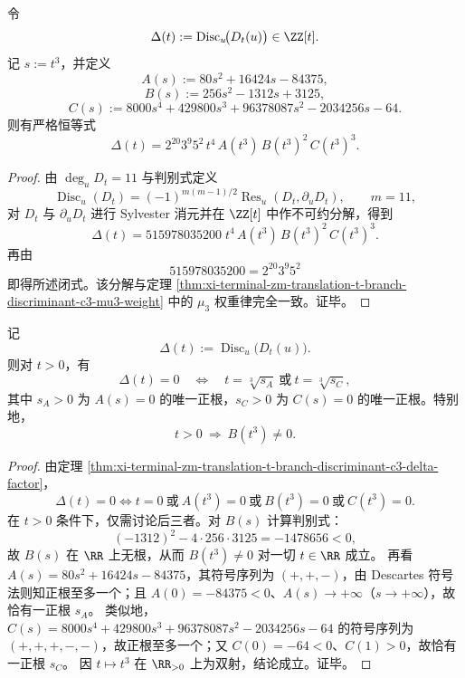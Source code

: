 \begin{theorem}[二次判别式 \texorpdfstring{$\Delta(t)=\operatorname{Disc}_u(D_t)$}{Delta(t)=Disc_u(Dt)} 的完全闭式分解]\label{thm:xi-terminal-zm-translation-t-branch-discriminant-c3-delta-factor}
令
\[
\Delta(t):=\operatorname{Disc}_u\!\bigl(D_t(u)\bigr)\in\ZZ[t].
\]
记 \(s:=t^3\)，并定义
\[
A(s):=80s^2+16424s-84375,
\]
\[
B(s):=256s^2-1312s+3125,
\]
\[
C(s):=8000s^4+429800s^3+96378087s^2-2034256s-64.
\]
则有严格恒等式
\[
\boxed{
\Delta(t)
=2^{20}3^{9}5^{2}\,t^4\,A(t^3)\,B(t^3)^2\,C(t^3)^3.}
\]
\end{theorem}
\begin{proof}
由 \(\deg_u D_t=11\) 与判别式定义
\[
\operatorname{Disc}_u(D_t)=(-1)^{m(m-1)/2}\operatorname{Res}_u(D_t,\partial_u D_t),\qquad m=11,
\]
对 \(D_t\) 与 \(\partial_u D_t\) 进行 Sylvester 消元并在 \(\ZZ[t]\) 中作不可约分解，得到
\[
\Delta(t)=515978035200\;t^4\,A(t^3)\,B(t^3)^2\,C(t^3)^3.
\]
再由
\[
515978035200=2^{20}3^{9}5^{2}
\]
即得所述闭式。该分解与定理
\ref{thm:xi-terminal-zm-translation-t-branch-discriminant-c3-mu3-weight}
中的 \(\mu_3\) 权重律完全一致。证毕。
\end{proof}

\begin{corollary}[正实参数半轴上的分歧碰撞仅发生于两处]\label{cor:xi-terminal-zm-translation-t-branch-discriminant-c3-real-collision}
记
\[
\Delta(t):=\operatorname{Disc}_u\!\bigl(D_t(u)\bigr).
\]
则对 \(t>0\)，有
\[
\Delta(t)=0
\quad\Longleftrightarrow\quad
t=\sqrt[3]{s_A}\ \text{或}\ t=\sqrt[3]{s_C},
\]
其中 \(s_A>0\) 为 \(A(s)=0\) 的唯一正根，\(s_C>0\) 为 \(C(s)=0\) 的唯一正根。特别地，
\[
t>0\ \Longrightarrow\ B(t^3)\neq 0.
\]
\end{corollary}
\begin{proof}
由定理 \ref{thm:xi-terminal-zm-translation-t-branch-discriminant-c3-delta-factor}，
\[
\Delta(t)=0
\iff
t=0\ \text{或}\ A(t^3)=0\ \text{或}\ B(t^3)=0\ \text{或}\ C(t^3)=0.
\]
在 \(t>0\) 条件下，仅需讨论后三者。对 \(B(s)\) 计算判别式：
\[
(-1312)^2-4\cdot 256\cdot 3125=-1478656<0,
\]
故 \(B(s)\) 在 \(\RR\) 上无根，从而 \(B(t^3)\neq 0\) 对一切 \(t\in\RR\) 成立。
再看 \(A(s)=80s^2+16424s-84375\)，其符号序列为 \((+,+,-)\)，由 Descartes 符号法则知正根至多一个；且 \(A(0)=-84375<0\)、\(A(s)\to+\infty\)（\(s\to+\infty\)），故恰有一正根 \(s_A\)。
类似地，\(C(s)=8000s^4+429800s^3+96378087s^2-2034256s-64\) 的符号序列为 \((+,+,+,-,-)\)，故正根至多一个；又 \(C(0)=-64<0\)、\(C(1)>0\)，故恰有一正根 \(s_C\)。
因 \(t\mapsto t^3\) 在 \(\RR_{>0}\) 上为双射，结论成立。证毕。
\end{proof}


